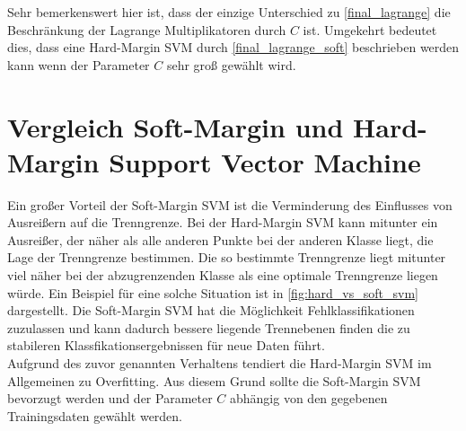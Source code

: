 \documentclass[a4paper,11pt,twoside]{scrreprt}
\begin{document}
Sehr bemerkenswert hier ist, dass der einzige Unterschied zu \autoref{final_lagrange} die Beschränkung der Lagrange Multiplikatoren durch $C$ ist. Umgekehrt bedeutet dies, dass eine Hard-Margin SVM durch \autoref{final_lagrange_soft} beschrieben werden kann wenn der Parameter $C$ sehr groß gewählt wird. \\

\section{Vergleich Soft-Margin und Hard-Margin Support Vector Machine}

Ein großer Vorteil der Soft-Margin \ac{SVM} ist die Verminderung des Einflusses von Ausreißern auf die Trenngrenze. Bei der Hard-Margin \ac{SVM} kann mitunter ein Ausreißer, der näher als alle anderen Punkte bei der anderen Klasse liegt, die Lage der Trenngrenze bestimmen. Die so bestimmte Trenngrenze liegt mitunter viel näher bei der abzugrenzenden Klasse als eine optimale Trenngrenze liegen würde. Ein Beispiel für eine solche Situation ist in \autoref{fig:hard_vs_soft_svm} dargestellt. Die Soft-Margin \ac{SVM} hat die Möglichkeit Fehlklassifikationen zuzulassen und kann dadurch bessere liegende Trennebenen finden die zu stabileren Klassfikationsergebnissen für neue Daten führt.\\

Aufgrund des zuvor genannten Verhaltens tendiert die Hard-Margin \ac{SVM} im Allgemeinen zu Overfitting. Aus diesem Grund sollte die Soft-Margin \ac{SVM} bevorzugt werden und der Parameter $C$ abhängig von den gegebenen Trainingsdaten gewählt werden.
\end{document}
